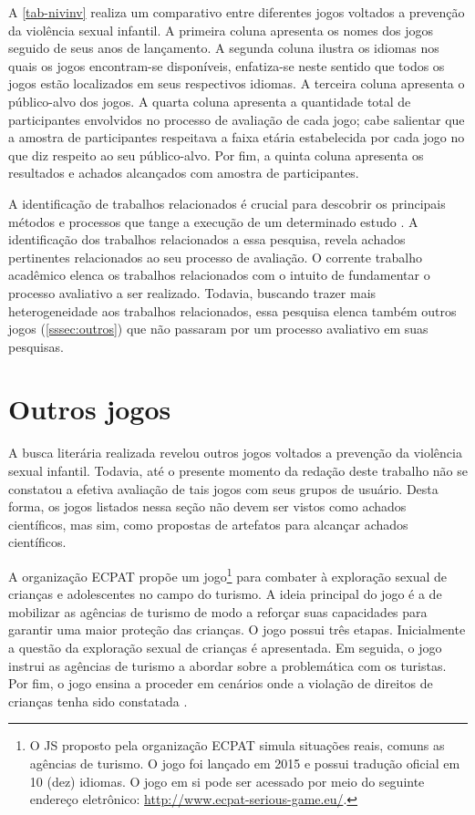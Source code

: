 A \autoref{tab-nivinv} realiza um comparativo entre diferentes jogos voltados a prevenção da violência sexual infantil. A primeira coluna apresenta os nomes dos jogos seguido de seus anos de lançamento. A segunda coluna ilustra os idiomas nos quais os jogos encontram-se disponíveis, enfatiza-se neste sentido que todos os jogos estão localizados em seus respectivos idiomas. A terceira coluna apresenta o público-alvo dos jogos. A quarta coluna apresenta a quantidade total de participantes envolvidos no processo de avaliação de cada jogo; cabe salientar que a amostra de participantes respeitava a faixa etária estabelecida por cada jogo no que diz respeito ao seu público-alvo. Por fim, a quinta coluna apresenta os resultados e achados alcançados com amostra de participantes. 

A identificação de trabalhos relacionados é crucial para descobrir os principais métodos e processos que tange a execução de um determinado estudo \cite{wazlawick2014metodologia}. A identificação dos trabalhos relacionados a essa pesquisa, revela achados pertinentes relacionados ao seu processo de avaliação. O corrente trabalho acadêmico elenca os trabalhos relacionados com o intuito de fundamentar o processo avaliativo a ser realizado. Todavia, buscando trazer mais heterogeneidade aos trabalhos relacionados, essa pesquisa elenca também outros jogos (\autoref{sssec:outros}) que não passaram por um processo avaliativo em suas pesquisas. 

\section{Outros jogos}\label{sssec:outros}

A busca literária realizada revelou outros jogos voltados a prevenção da violência sexual infantil. Todavia, até o presente momento da redação deste trabalho não se constatou a efetiva avaliação de tais jogos com seus grupos de usuário. Desta forma, os jogos listados nessa seção não devem ser vistos como achados científicos, mas sim, como propostas de artefatos para alcançar achados científicos.

A organização \ac{ECPAT} propõe um jogo\footnote{O \acf{JS} proposto pela organização \acf{ECPAT} simula situações reais, comuns as agências de turismo. O jogo foi lançado em 2015 e possui tradução oficial em 10 (dez) idiomas. O jogo em si pode ser acessado por meio do seguinte endereço eletrônico: \url{http://www.ecpat-serious-game.eu/}.} para combater à exploração sexual de crianças e adolescentes no campo do turismo. A ideia principal do jogo é a de mobilizar as agências de turismo de modo a reforçar suas capacidades para garantir uma maior proteção das crianças. O jogo possui três etapas. Inicialmente a questão da exploração sexual de crianças é apresentada. Em seguida, o jogo instrui as agências de turismo a abordar sobre a problemática com os turistas. Por fim, o jogo ensina a proceder em cenários onde a violação de direitos de crianças tenha sido constatada \cite{gopalan2018social}. 

